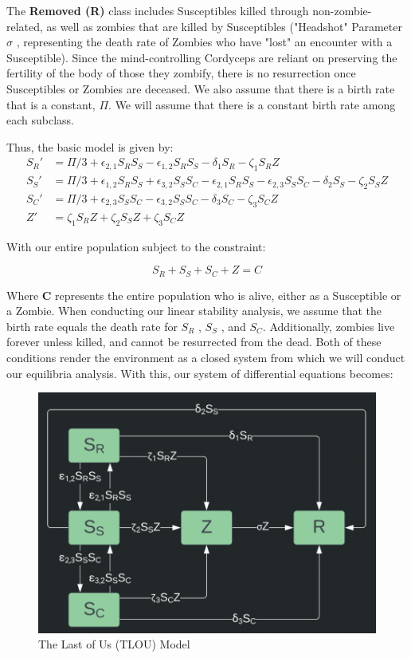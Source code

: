 \documentclass{article}
\begin{document}
The \textbf{Removed (R)} class includes Susceptibles killed through non-zombie-related, as well as zombies that are killed by Susceptibles ("Headshot" Parameter $\sigma$ , representing the death rate of Zombies who have "lost" an encounter with a Susceptible). Since the mind-controlling Cordyceps are reliant on preserving the fertility of the body of those they zombify, there is no resurrection once Susceptibles or Zombies are deceased. We also assume that there is a birth rate that is a constant, $\Pi$. We will assume that there is a constant birth rate among each subclass.

Thus, the basic model is given by: 
\begin{align*}
    S_R' &= \Pi/3 + \epsilon_{2,1}S_RS_S - \epsilon_{1,2}S_RS_S - \delta_1S_R - \zeta_1S_RZ \\
S_S' &= \Pi/3 + \epsilon_{1,2}S_RS_S + \epsilon_{3,2}S_SS_C - \epsilon_{2,1}S_RS_S - \epsilon_{2,3}S_SS_C - \delta_2S_S - \zeta_2S_SZ\\
S_C' &= \Pi/3 + \epsilon_{2,3}S_SS_C - \epsilon_{3,2}S_SS_C - \delta_3S_C - \zeta_3S_CZ\\
Z' &= \zeta_1S_RZ + \zeta_2S_SZ + \zeta_3S_CZ
\end{align*}

With our entire population subject to the constraint:

$$S_R + S_S + S_C + Z = C$$

Where \textbf{C} represents the entire population who is alive, either as a Susceptible or a Zombie. When conducting our linear stability analysis, we assume that the birth rate equals the death rate for $S_R$ , $S_S$ , and $S_C$. Additionally, zombies live forever unless killed, and cannot be resurrected from the dead. Both of these conditions render the environment as a closed system from which we will conduct our equilibria analysis. With this, our system of differential equations becomes: 




\begin{figure}
\centering
\includegraphics[width=1\textwidth]{TLOU Model Outline.png}
\caption{\label{fig:frog} The Last of Us (TLOU) Model}
\end{figure}
\end{document}
